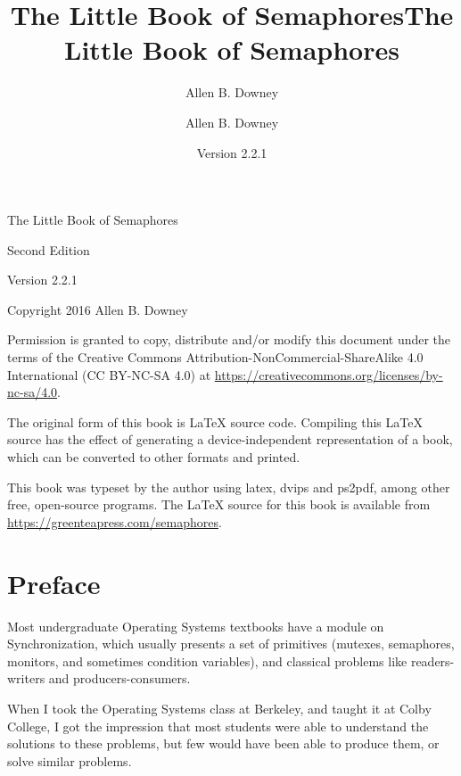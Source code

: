 \documentclass{book}
\title{The Little Book of Semaphores}
\author{Allen B. Downey}
\newcommand{\theversion}{Version 2.2.1}
\begin{document}
\title {The Little Book of Semaphores}
\author {Allen B. Downey}

\date {\theversion}
\maketitle

\vspace{2in}
\begin{center}
    {\Large The Little Book of Semaphores}

    Second Edition
    \vspace{0.25in}

    \theversion
    \vspace{0.25in}

    Copyright 2016 Allen B. Downey
\end{center}
\vspace{0.25in}

Permission is granted to copy, distribute and/or modify this document under the terms of the Creative Commons Attribution-NonCommercial-ShareAlike 4.0 International (CC BY-NC-SA 4.0) at {\footnotesize \url{https://creativecommons.org/licenses/by-nc-sa/4.0}}.

The original form of this book is LaTeX source code. Compiling this LaTeX source has the effect of generating a device-independent representation of a book, which can be converted to other formats and printed.

This book was typeset by the author using latex, dvips and ps2pdf, among other free, open-source programs. The LaTeX source for this book is available from \url{https://greenteapress.com/semaphores}.

\frontmatter

\chapter{Preface}

Most undergraduate Operating Systems textbooks have a module on Synchronization, which usually presents a set of primitives (mutexes, semaphores, monitors, and sometimes condition variables), and classical problems like readers-writers and producers-consumers.

When I took the Operating Systems class at Berkeley, and taught it at Colby College, I got the impression that most students were able to understand the solutions to these problems, but few would have been able to produce them, or solve similar problems.
\end{document}
